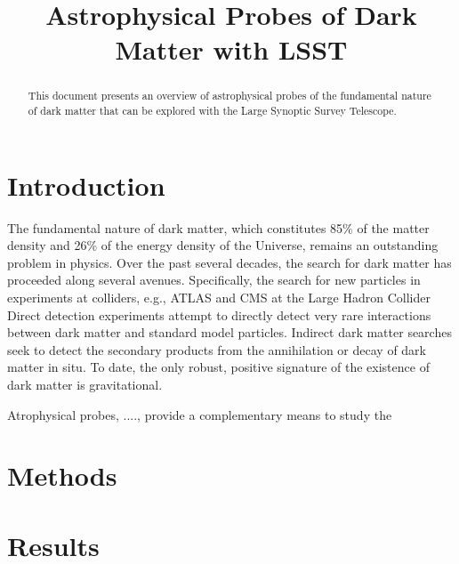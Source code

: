 \documentclass[\docopts]{\docclass}
\begin{document}
\title{Astrophysical Probes of Dark Matter with LSST}

\maketitlepre

\begin{abstract}

This document presents an overview of astrophysical probes of the fundamental nature of dark matter that can be explored with the Large Synoptic Survey Telescope.

\end{abstract}

\dockeys{}

\maketitlepost

\tableofcontents

\section{Introduction}
\label{sec:intro}

  The fundamental nature of dark matter, which constitutes 85\% of the matter density and 26\% of the energy density of the Universe, remains an outstanding problem in physics.
Over the past several decades, the search for dark matter has proceeded along several avenues.
Specifically, the search for new particles in experiments at colliders, e.g., ATLAS and CMS at the Large Hadron Collider
Direct detection experiments attempt to directly detect very rare interactions between dark matter and standard model particles.
Indirect dark matter searches seek to detect the secondary products from the annihilation or decay of dark matter in situ.
To date, the only robust, positive signature of the existence of dark matter is gravitational.

Atrophysical probes, ...., provide a complementary means to study the 



\section{Methods}
\label{sec:methods}



\section{Results}
\label{sec:results}
\end{document}

